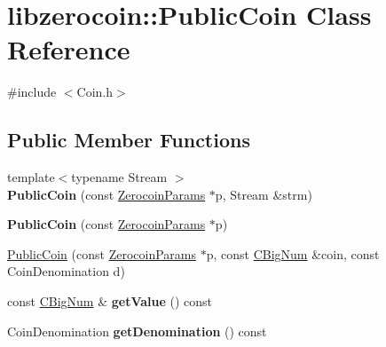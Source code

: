 \hypertarget{classlibzerocoin_1_1_public_coin}{}\section{libzerocoin\+:\+:Public\+Coin Class Reference}
\label{classlibzerocoin_1_1_public_coin}


{\ttfamily \#include $<$Coin.\+h$>$}

\subsection*{Public Member Functions}
\begin{DoxyCompactItemize}
\item 
\mbox{\label{classlibzerocoin_1_1_public_coin_ad4544eb813805545f3cb16e75a110415}} 
{\footnotesize template$<$typename Stream $>$ }\\{\bfseries Public\+Coin} (const \mbox{\hyperlink{classlibzerocoin_1_1_zerocoin_params}{Zerocoin\+Params}} $\ast$p, Stream \&strm)
\item 
\mbox{\label{classlibzerocoin_1_1_public_coin_a3d4568ae75e82a14be9d2b1e9e11b17f}} 
{\bfseries Public\+Coin} (const \mbox{\hyperlink{classlibzerocoin_1_1_zerocoin_params}{Zerocoin\+Params}} $\ast$p)
\item 
\mbox{\hyperlink{classlibzerocoin_1_1_public_coin_a514aa6588149238148c7cbae15181b1c}{Public\+Coin}} (const \mbox{\hyperlink{classlibzerocoin_1_1_zerocoin_params}{Zerocoin\+Params}} $\ast$p, const \mbox{\hyperlink{class_c_big_num}{C\+Big\+Num}} \&coin, const Coin\+Denomination d)
\item 
\mbox{\label{classlibzerocoin_1_1_public_coin_abf335a1f7458e510bf46a73611200b3b}} 
const \mbox{\hyperlink{class_c_big_num}{C\+Big\+Num}} \& {\bfseries get\+Value} () const
\item 
\mbox{\label{classlibzerocoin_1_1_public_coin_a150f84ac8998d73e223c74a311d48891}} 
Coin\+Denomination {\bfseries get\+Denomination} () const
\item 
\mbox{\label{classlibzerocoin_1_1_public_coin_a29c59b2fd71163c417eb35633fdf0e8c}} 

\end{DoxyCompactItemize}

